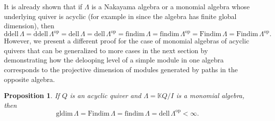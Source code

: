 \documentclass{conm-p-l}
\newcommand{\findim}{\mathrm{findim}\,}
\newcommand{\Findim}{\mathrm{Findim}\,}
\newcommand{\dell}{\mathrm{dell}\,}
\renewcommand{\dell}{\mathrm{dell}\,}
\newcommand{\gldim}{\mathrm{gldim}\,}
\newcommand{\op}{\mathrm{op}}
\renewcommand{\k}{\mathbb{K}}
\newcommand{\ddell}{\mathrm{ddell}\,}
\newtheorem{proposition}[theorem]{Proposition}
\theoremstyle{definition}
\theoremstyle{remark}
\numberwithin{equation}{section}
\begin{document}
It is already shown that if $\Lambda$ is a Nakayama algebra \cite{ringel2021finitistic, sen2021delooping} or a monomial algebra whose underlying quiver is acyclic (for example in \cite[Proposition 2.3]{guo2024symmetry} since the algebra has finite global dimension), then
\begin{equation}
\label{eq:all invariants equal}
\ddell\Lambda=\ddell\Lambda^{\op}=\dell\Lambda=\dell\Lambda^{\op}=\findim\Lambda=\findim\Lambda^{\op}=\Findim\Lambda=\Findim\Lambda^{\op}.
\end{equation}
However, we present a different proof for the case of monomial algebras of acyclic quivers that can be generalized to more cases in the next section by demonstrating how the delooping level of a simple module in one algebra corresponds to the projective dimension of modules generated by paths in the opposite algebra.

\begin{proposition}
\label{prop:tree dell findim}
If $Q$ is an acyclic quiver and $\Lambda=\k Q/I$ is a monomial algebra, then 
\[
\gldim\Lambda=\Findim\Lambda=\findim\Lambda = \dell\Lambda^{\op}<\infty.
\]
\end{proposition}
\end{document}
